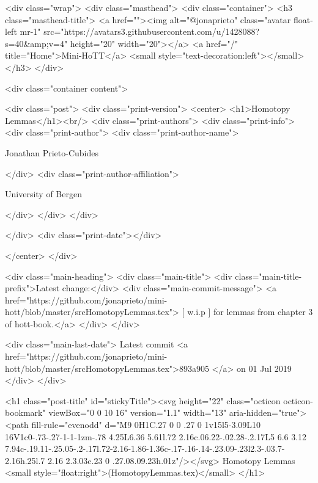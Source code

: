     <div class="wrap">
      <div class="masthead">
        <div class="container">
          <h3 class="masthead-title">
            <a href=""><img alt="@jonaprieto" class="avatar float-left mr-1" src="https://avatars3.githubusercontent.com/u/1428088?s=40&amp;v=4" height="20" width="20"></a>
            <a href="/" title="Home">Mini-HoTT</a>
            <small style="text-decoration:left"></small>
          </h3>
        </div>
      
      <div class="container content">
        







<div class="post">
  <div class="print-version">
    <center>
      <h1>Homotopy Lemmas</h1><br/>
        <div class="print-authors">
          <div class="print-info">
            <div class="print-author">
              <div class="print-author-name">
                
                  Jonathan Prieto-Cubides
                
              </div>
              <div class="print-author-affiliation">
                
                  University of Bergen
                
                </div>
            </div>
          </div>
          
          
        </div>
        <div class="print-date"></div>
        
        
    </center>
  </div>

  
  <div class="main-heading">
    <div class="main-title">
      <div class="main-title-prefix">Latest change:</div>
      <div class="main-commit-message">
            <a href="https://github.com/jonaprieto/mini-hott/blob/master/srcHomotopyLemmas.tex">
              [ w.i.p ] for lemmas from chapter 3 of hott-book.</a>
      </div>
    </div>

    <div class="main-last-date">
      Latest commit <a href="https://github.com/jonaprieto/mini-hott/blob/master/srcHomotopyLemmas.tex">893a905 </a> on  01 Jul 2019
    </div>
  </div>
  

  <h1 class="post-title" id="stickyTitle"><svg height="22" class="octicon octicon-bookmark" viewBox="0 0 10 16" version="1.1" width="13" aria-hidden="true"><path fill-rule="evenodd" d="M9 0H1C.27 0 0 .27 0 1v15l5-3.09L10 16V1c0-.73-.27-1-1-1zm-.78 4.25L6.36 5.61l.72 2.16c.06.22-.02.28-.2.17L5 6.6 3.12 7.94c-.19.11-.25.05-.2-.17l.72-2.16-1.86-1.36c-.17-.16-.14-.23.09-.23l2.3-.03.7-2.16h.25l.7 2.16 2.3.03c.23 0 .27.08.09.23h.01z"/></svg> Homotopy Lemmas <small style="float:right">(HomotopyLemmas.tex)</small>
  </h1>

